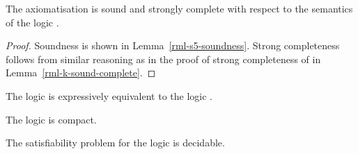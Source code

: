 \begin{theorem}
The axiomatisation \axiomRmlS{} is sound and strongly complete with respect to the semantics of the logic \logicRmlS{}.
\end{theorem}

\begin{proof}
Soundness is shown in Lemma~\ref{rml-s5-soundness}.
Strong completeness follows from similar reasoning as in the proof of strong completeness of \logicRmlK{} in Lemma~\ref{rml-k-sound-complete}.
\end{proof}

\begin{corollary}
The logic \logicRmlS{} is expressively equivalent to the logic \logicS{}.
\end{corollary}

\begin{corollary}
The logic \logicRmlS{} is compact.
\end{corollary}

\begin{corollary}
The satisfiability problem for the logic \logicRmlS{} is decidable.
\end{corollary}
